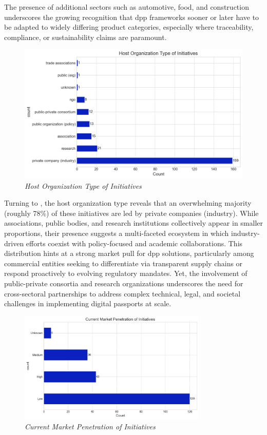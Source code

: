 The presence of additional sectors such as automotive, food, and construction underscores the growing recognition that \ac{dpp} frameworks sooner or later have to be adapted to widely differing product categories, especially where traceability, compliance, or sustainability claims are paramount.

\begin{figure}[htbp]
  \centering
  \includegraphics[width=\textwidth]{figures/initiatives_org_type.png}
  \caption{%
    \textit{Host Organization Type of Initiatives} 
  }
  \label{fig:initiatives_org_type}
\end{figure}

Turning to , the host organization type reveals that an overwhelming majority (roughly 78\%) of these initiatives are led by private companies (industry). While associations, public bodies, and research institutions collectively appear in smaller proportions, their presence suggests a multi-faceted ecosystem in which industry-driven efforts coexist with policy-focused and academic collaborations. This distribution hints at a strong market pull for \ac{dpp} solutions, particularly among commercial entities seeking to differentiate via transparent supply chains or respond proactively to evolving regulatory mandates. Yet, the involvement of public-private consortia and research organizations underscores the need for cross-sectoral partnerships to address complex technical, legal, and societal challenges in implementing digital passports at scale.

\begin{figure}[H]
  \centering
  \includegraphics[width=0.8\textwidth]{figures/initiatives_market_penetration.png}
  \caption{%
    \textit{Current Market Penetration of Initiatives} 
  }
  \label{fig:initiatives_market_penetration}
\end{figure}


